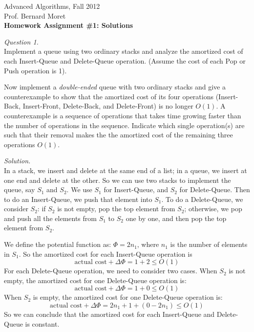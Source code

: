 \documentclass[11pt]{article}
\begin{document}
\begin{center}
  \Large\sf Advanced Algorithms, Fall 2012\\

  \medskip
  \large\sf Prof. Bernard Moret\\

  \medskip\bigskip
  \Large\bf Homework Assignment \#1: Solutions\\
\end{center}

\medskip\bigskip\rm\noindent
\emph{Question 1.}\\
Implement a queue using two ordinary stacks and analyze the amortized cost
of each Insert-Queue and Delete-Queue operation. (Assume the cost of each
Pop or Push operation is 1).

Now implement a \emph{double-ended} queue with two ordinary stacks and give
a counterexample to show that the amortized cost of its four operations
(Insert-Back, Insert-Front, Delete-Back, and Delete-Front) is no longer
$O(1)$.  A counterexample is a sequence of operations that takes time
growing faster than the number of operations in the sequence.
Indicate which single operation(s) are such that their removal
makes the the amortized cost of the remaining three operations $O(1)$.

\noindent\emph{Solution.}\\
In a stack, we insert and delete at the same end of a list; in a queue, we
insert at one end and delete at the other. So we can use two stacks to
implement the queue, say $S_1$ and $S_2$. We use $S_1$ for Insert-Queue, and
$S_2$ for Delete-Queue. Then to do an Insert-Queue, we push that element into
$S_1$. To do a Delete-Queue, we consider $S_2$: if $S_2$ is not empty, pop the
top element from $S_2$; otherwise, we pop and push all the elements from $S_1$
to $S_2$ one by one, and then pop the top element from $S_2$.

We define the potential function as: $\Phi = 2n_1$, where $n_1$ is the number
of elements in $S_1$. So the amortized cost for each Insert-Queue operation is
  $$\text{actual cost} + \Delta\Phi = 1+2 \leqslant O(1)$$
For each Delete-Queue operation, we need to consider two cases. When $S_2$ is
not empty, the amortized cost for one Delete-Queue operation is:
  $$\text{actual cost} + \Delta\Phi = 1+0 \leqslant O(1)$$
When $S_2$ is empty, the amortized cost for one Delete-Queue operation is:
  $$\text{actual cost} + \Delta\Phi = 2n_1+1+(0-2n_1) \leqslant O(1)$$
So we can conclude that the amortized cost for each Insert-Queue and
Delete-Queue is constant.
\end{document}
